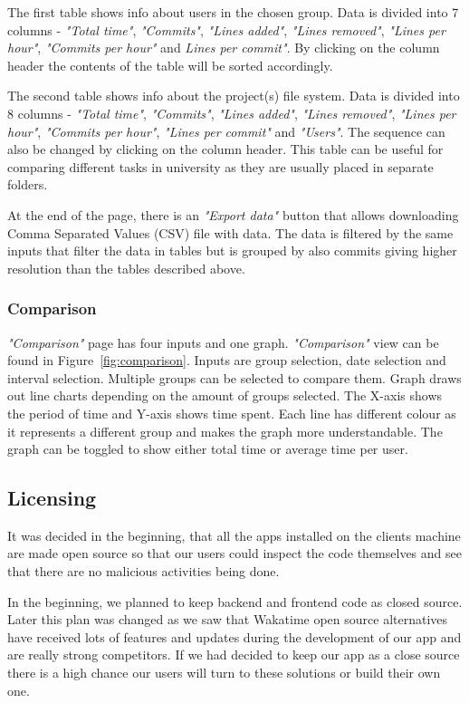 The first table shows info about users in the chosen group.
Data is divided into 7 columns - \textit{"Total time"}, \textit{"Commits"}, \textit{"Lines added"}, \textit{"Lines removed"},
\textit{"Lines per hour"}, \textit{"Commits per hour"} and \textit{Lines per commit"}.
By clicking on the column header the contents of the table will be sorted accordingly.

The second table shows info about the project(s) file system.
Data is divided into 8 columns - \textit{"Total time"}, \textit{"Commits"}, \textit{"Lines added"}, \textit{"Lines removed"},
\textit{"Lines per hour"}, \textit{"Commits per hour"}, \textit{"Lines per commit"} and \textit{"Users"}.
The sequence can also be changed by clicking on the column header.
This table can be useful for comparing different tasks in university as they are usually placed in separate folders.

At the end of the page, there is an \textit{"Export data"} button that allows downloading Comma Separated Values (CSV) file with data.
The data is filtered by the same inputs that filter the data in tables but is grouped
by also commits giving higher resolution than the tables described above.


\subsubsection{Comparison}\label{subsubsec:comparison}
\textit{"Comparison"} page has four inputs and one graph.
\textit{"Comparison"} view can be found in Figure~\ref{fig:comparison}.
Inputs are group selection, date selection and interval selection.
Multiple groups can be selected to compare them.
Graph draws out line charts depending on the amount of groups selected.
The X-axis shows the period of time and Y-axis shows time spent.
Each line has different colour as it represents a different group and makes the graph more understandable.
The graph can be toggled to show either total time or average time per user.

\subsection{Licensing}\label{subsec:licencing}
It was decided in the beginning, that all the apps installed on the clients machine are made open source so that
our users could inspect the code themselves and see that there are no malicious activities being done.

In the beginning, we planned to keep backend and frontend code as closed source.
Later this plan was changed as we saw that Wakatime open source alternatives have received lots of features and updates
during the development of our app and are really strong competitors.
If we had decided to keep our app as a close source there is a high chance our users will turn to these solutions or build their own one.

